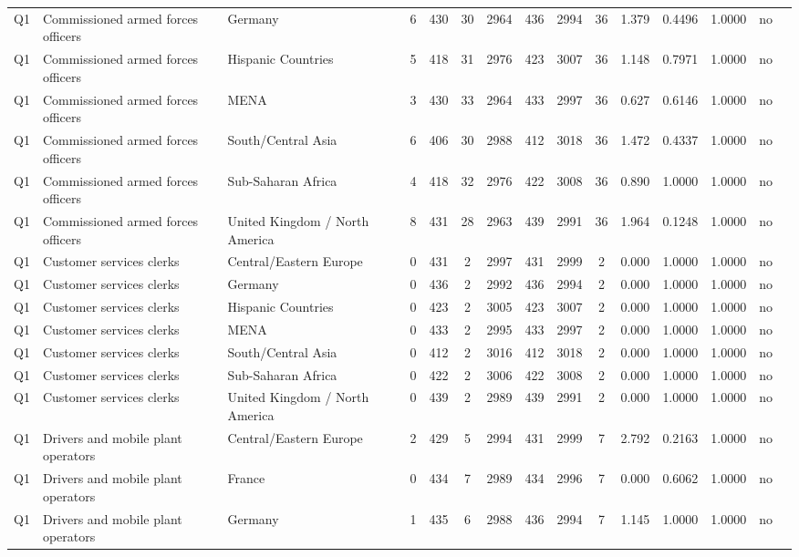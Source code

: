 \begin{longtable}{lllrcccccccccll}
Q1 & Commissioned armed forces officers & Germany & 6 & 430 & 30 & 2964 & 436 & 2994 & 36 & 1.379 & 0.4496 & 1.0000 & no \\
Q1 & Commissioned armed forces officers & Hispanic Countries & 5 & 418 & 31 & 2976 & 423 & 3007 & 36 & 1.148 & 0.7971 & 1.0000 & no \\
Q1 & Commissioned armed forces officers & MENA & 3 & 430 & 33 & 2964 & 433 & 2997 & 36 & 0.627 & 0.6146 & 1.0000 & no \\
Q1 & Commissioned armed forces officers & South/Central Asia & 6 & 406 & 30 & 2988 & 412 & 3018 & 36 & 1.472 & 0.4337 & 1.0000 & no \\
Q1 & Commissioned armed forces officers & Sub-Saharan Africa & 4 & 418 & 32 & 2976 & 422 & 3008 & 36 & 0.890 & 1.0000 & 1.0000 & no \\
Q1 & Commissioned armed forces officers & United Kingdom / North America & 8 & 431 & 28 & 2963 & 439 & 2991 & 36 & 1.964 & 0.1248 & 1.0000 & no \\
Q1 & Customer services clerks & Central/Eastern Europe & 0 & 431 & 2 & 2997 & 431 & 2999 & 2 & 0.000 & 1.0000 & 1.0000 & no \\
Q1 & Customer services clerks & Germany & 0 & 436 & 2 & 2992 & 436 & 2994 & 2 & 0.000 & 1.0000 & 1.0000 & no \\
Q1 & Customer services clerks & Hispanic Countries & 0 & 423 & 2 & 3005 & 423 & 3007 & 2 & 0.000 & 1.0000 & 1.0000 & no \\
Q1 & Customer services clerks & MENA & 0 & 433 & 2 & 2995 & 433 & 2997 & 2 & 0.000 & 1.0000 & 1.0000 & no \\
Q1 & Customer services clerks & South/Central Asia & 0 & 412 & 2 & 3016 & 412 & 3018 & 2 & 0.000 & 1.0000 & 1.0000 & no \\
Q1 & Customer services clerks & Sub-Saharan Africa & 0 & 422 & 2 & 3006 & 422 & 3008 & 2 & 0.000 & 1.0000 & 1.0000 & no \\
Q1 & Customer services clerks & United Kingdom / North America & 0 & 439 & 2 & 2989 & 439 & 2991 & 2 & 0.000 & 1.0000 & 1.0000 & no \\
Q1 & Drivers and mobile plant operators & Central/Eastern Europe & 2 & 429 & 5 & 2994 & 431 & 2999 & 7 & 2.792 & 0.2163 & 1.0000 & no \\
Q1 & Drivers and mobile plant operators & France & 0 & 434 & 7 & 2989 & 434 & 2996 & 7 & 0.000 & 0.6062 & 1.0000 & no \\
Q1 & Drivers and mobile plant operators & Germany & 1 & 435 & 6 & 2988 & 436 & 2994 & 7 & 1.145 & 1.0000 & 1.0000 & no \\

\end{longtable}
